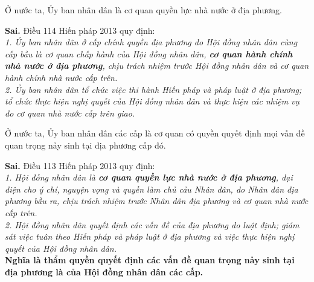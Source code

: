 \begin{ques}
Ở nước ta, Ủy ban nhân dân là cơ quan quyền lực nhà nước ở địa phương.
\end{ques}
\begin{ans}
\textbf{Sai.} Điều 114 Hiến pháp 2013 quy định:\\
\textit{1. Ủy ban nhân dân ở cấp chính quyền địa phương do Hội đồng nhân dân cùng cấp bầu là cơ quan chấp hành của Hội đồng nhân dân, \textbf{cơ quan hành chính nhà nước ở địa phương}, chịu trách nhiệm trước Hội đồng nhân dân và cơ quan hành chính nhà nước cấp trên.}\\
\textit{2. Ủy ban nhân dân tổ chức việc thi hành Hiến pháp và pháp luật ở địa phương; tổ chức thực hiện nghị quyết của Hội đồng nhân dân và thực hiện các nhiệm vụ do cơ quan nhà nước cấp trên giao.}
\end{ans}

\begin{ques}
Ở nước ta, Ủy ban nhân dân các cấp là cơ quan có quyền quyết định mọi vấn đề quan trọng nảy sinh tại địa phương cấp đó.
\end{ques}
\begin{ans}
\textbf{Sai.} Điều 113 Hiến pháp 2013 quy định: \\
\textit{1. Hội đồng nhân dân là \textbf{cơ quan quyền lực nhà nước ở địa phương}, đại diện cho ý chí, nguyện vọng và quyền làm chủ cảu Nhân dân, do Nhân dân địa phương bầu ra, chịu trách nhiệm trước Nhân dân địa phương và cơ quan nhà nước cấp trên.}\\
\textit{2. Hội đồng nhân dân quyết định các vấn đề của địa phương do luật định; giám sát việc tuân theo Hiến pháp và pháp luật ở địa phương và việc thực hiện nghị quyết của Hội đồng nhân dân.}\\
\textbf{Nghĩa là thẩm quyền quyết định các vấn đề quan trọng nảy sinh tại địa phương là của Hội đồng nhân dân các cấp.}
\end{ans}